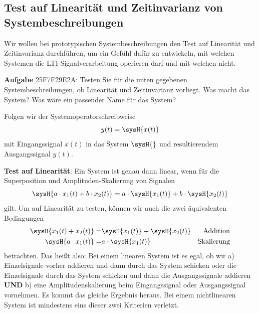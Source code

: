 \clearpage
\subsection{Test auf Linearität und Zeitinvarianz von Systembeschreibungen}
\label{sec:25F7F29E2A}
\begin{Ziel}
Wir wollen bei prototypischen Systembeschreibungen den Test auf
Linearität und Zeitinvarianz durchführen, um ein Gefühl dafür zu entwickeln,
mit welchen Systemen die LTI-Signalverarbeitung operieren darf und mit welchen nicht.
\end{Ziel}
\textbf{Aufgabe} {\tiny 25F7F29E2A}: Testen Sie für die unten gegebenen
Systembeschreibungen, ob Linearität und Zeitinvarianz vorliegt.
Was macht das System? Was wäre ein passender Name für das System?
\begin{Werkzeug}
Folgen wir der Systemoperatorschreibweise
\begin{equation}
y(t) = \sysH{x(t)}
\end{equation}
mit Eingangssignal $x(t)$ in das System $\sysH{}$ und resultierendem
Ausgangssignal $y(t)$.

\textbf{Test auf Linearität}:
%
Ein System ist genau dann linear, wenn für die Superposition und Amplituden-Skalierung
von Signalen
\begin{equation}
\sysH{a\cdot x_1(t) + b\cdot x_2(t)} = a\cdot\sysH{x_1(t)} + b\cdot\sysH{x_2(t)}
\end{equation}
gilt.
Um auf Linearität zu testen, können wir auch die zwei äquivalenten Bedingungen
\begin{align}
\sysH{x_1(t) + x_2(t)} =& \sysH{x_1(t)} + \sysH{x_2(t)} &\text{Addition}\\
\sysH{a \cdot x_1(t)} =& a \cdot \sysH{x_1(t)} &\text{Skalierung}
\end{align}
betrachten.
Das heißt also: Bei einem linearen System ist es egal, ob wir a) Einzelsignale
vorher addieren und dann durch das System schicken oder die Einzelsignale durch das
System schicken und dann die Ausgangssignale addieren \textbf{UND} b)
eine Amplitudenskalierung beim Eingangssignal oder Ausgangssignal vornehmen. Es kommt
das gleiche Ergebnis heraus. Bei einem nichtlinearen System ist mindestens eins dieser
zwei Kriterien verletzt.


\end{Werkzeug}
